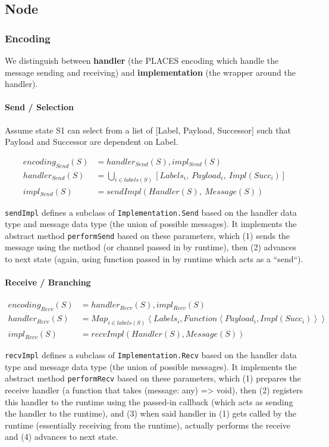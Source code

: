 \documentclass{article}
\begin{document}
\subsection{Node}

\subsubsection{Encoding}
We distinguish between \textbf{handler} (the PLACES encoding which handle the
message sending and receiving) and \textbf{implementation} (the wrapper around the handler).

\paragraph{Send / Selection}
Assume state S1 can select from a list of [Label, Payload, Successor] such that Payload and Successor
are dependent on Label.

\begin{align}
encoding_{Send}(S) &= handler_{Send}(S), impl_{Send}(S) \\
handler_{Send}(S) &= \bigcup_{i \in labels(S)} [Labels_i,~Payload_i,~Impl(Succ_i)] \\
impl_{Send}(S) &= sendImpl(Handler(S),~Message(S))
\end{align}

\texttt{sendImpl} defines a subclass of \texttt{Implementation.Send} based on the handler data type
and message data type (the union of possible messages). It implements the abstract method
\texttt{performSend} based on these parameters, which (1) sends the message using
the method (or channel passed in by runtime), then (2) advances to next state (again, using
function passed in by runtime which acts as a ``send``).

\paragraph{Receive / Branching}

\begin{align}
encoding_{Recv}(S) &= handler_{Recv}(S), impl_{Recv}(S) \\
handler_{Recv}(S) &= Map_{i \in labels(S)}\left<Labels_i, Function\left<Payload_i, Impl(Succ_i)\right>\right> \\
impl_{Recv}(S) &= recvImpl(Handler(S), Message(S))
\end{align}

\texttt{recvImpl} defines a subclass of \texttt{Implementation.Recv} based on the handler data type
and message data type (the union of possible messages). It implements the abstract method
\texttt{performRecv} based on these parameters, which (1) prepares the receive handler (a function that takes
(message: any) => void), then (2) registers this handler to the runtime using the passed-in callback
(which acts as sending the handler to the runtime), and (3) when said handler in (1) gets called by the runtime
(essentially receiving from the runtime), actually performs the receive and (4) advances to next state.
\end{document}
